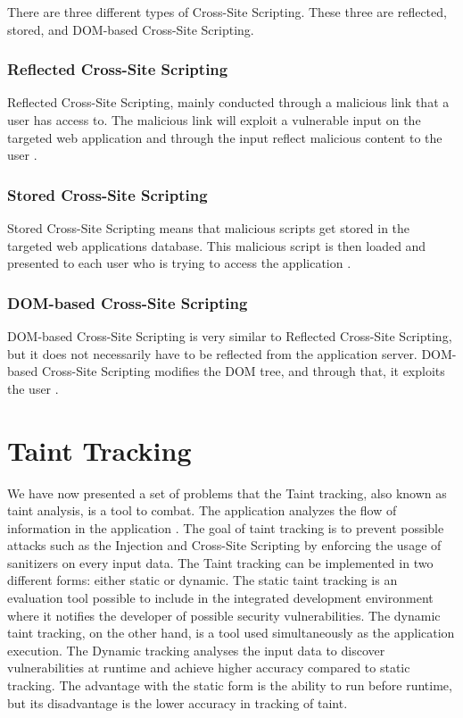There are three different types of Cross-Site Scripting. These three are reflected, stored, and DOM-based Cross-Site Scripting.



\subsubsection{Reflected Cross-Site Scripting}
Reflected Cross-Site Scripting, mainly conducted through a malicious link that a user has access to. The malicious link will exploit a vulnerable input on the targeted web application and through the input reflect malicious content to the user \parencite{Secure_Web}.



\subsubsection{Stored Cross-Site Scripting}
Stored Cross-Site Scripting means that malicious scripts get stored in the targeted web applications database. This malicious script is then loaded and presented to each user who is trying to access the application \parencite{Secure_Web}.



\subsubsection{DOM-based Cross-Site Scripting}
DOM-based Cross-Site Scripting is very similar to Reflected Cross-Site Scripting, but it does not necessarily have to be reflected from the application server. DOM-based Cross-Site Scripting modifies the DOM tree, and through that, it exploits the user \parencite{Secure_Web}.



\section{Taint Tracking}
\label{DynamicTaintTracking}
We have now presented a set of problems that the Taint tracking, also known as taint analysis, is a tool to combat. The application analyzes the flow of information in the application \parencite{Pan2015}. The goal of taint tracking is to prevent possible attacks such as the Injection and Cross-Site Scripting by enforcing the usage of sanitizers on every input data. The Taint tracking can be implemented in two different forms: either static or dynamic. The static taint tracking is an evaluation tool possible to include in the integrated development environment where it notifies the developer of possible security vulnerabilities. The dynamic taint tracking, on the other hand, is a tool used simultaneously as the application execution. The Dynamic tracking analyses the input data to discover vulnerabilities at runtime and achieve higher accuracy compared to static tracking. The advantage with the static form is the ability to run before runtime, but its disadvantage is the lower accuracy in tracking of taint.

